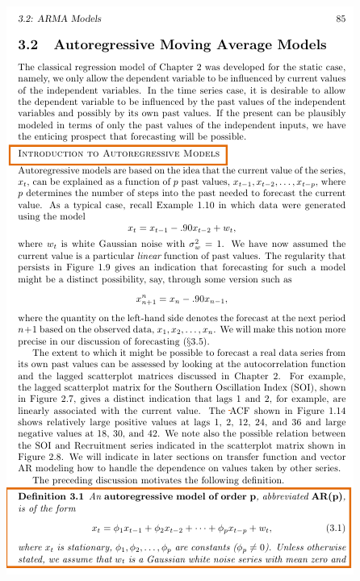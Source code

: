 \documentclass{article}
\begin{document}
\newpage\includegraphics[width=.9\textwidth]{shumway2}
\end{document}
